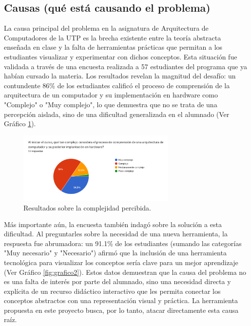 \documentclass[12pt, letterpaper]{article} %
\begin{document}
\subsection{Causas (qué está causando el problema)}
La causa principal del problema en la asignatura de Arquitectura de Computadores de la UTP es la brecha existente entre la teoría abstracta enseñada en clase y la falta de herramientas prácticas que permitan a los estudiantes visualizar y experimentar con dichos conceptos. Esta situación fue validada a través de una encuesta realizada a 57 estudiantes del programa que ya habían cursado la materia. Los resultados revelan la magnitud del desafío: un contundente 86\% de los estudiantes calificó el proceso de comprensión de la arquitectura de un computador y su implementación en hardware como "Complejo" o "Muy complejo", lo que demuestra que no se trata de una percepción aislada, sino de una dificultad generalizada en el alumnado (Ver Gráfico \ref{fig:grafico1}).

\begin{figure}[h!]
    \centering
    \includegraphics[width=0.7\textwidth]{figura1.png}
    \caption{Resultados sobre la complejidad percibida.}
    \label{fig:grafico1}
\end{figure}


\FloatBarrier %

Más importante aún, la encuesta también indagó sobre la solución a esta dificultad. Al preguntarles sobre la necesidad de una nueva herramienta, la respuesta fue abrumadora: un 91.1\% de los estudiantes (sumando las categorías "Muy necesario" y "Necesario") afirmó que la inclusión de una herramienta tecnológica para visualizar los conceptos sería clave para un mejor aprendizaje (Ver Gráfico \ref{fig:grafico2}).  Estos datos demuestran que la causa del problema no es una falta de interés por parte del alumnado, sino una necesidad directa y explícita de un recurso didáctico interactivo que les permita conectar los conceptos abstractos con una representación visual y práctica. La herramienta propuesta en este proyecto busca, por lo tanto, atacar directamente esta causa raíz.
\end{document}
